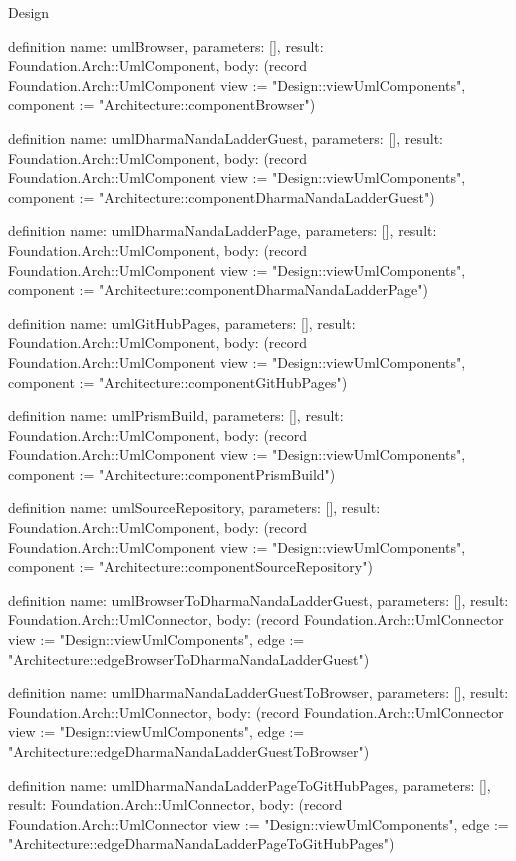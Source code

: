 \begin{lexlean}{Design}
\begin{semanticmodule}
definition{
  name: umlBrowser,
  parameters: [],
  result: Foundation.Arch::UmlComponent,
  body: (record Foundation.Arch::UmlComponent {view := "Design::viewUmlComponents", component := "Architecture::componentBrowser"})
}

definition{
  name: umlDharmaNandaLadderGuest,
  parameters: [],
  result: Foundation.Arch::UmlComponent,
  body: (record Foundation.Arch::UmlComponent {view := "Design::viewUmlComponents", component := "Architecture::componentDharmaNandaLadderGuest"})
}

definition{
  name: umlDharmaNandaLadderPage,
  parameters: [],
  result: Foundation.Arch::UmlComponent,
  body: (record Foundation.Arch::UmlComponent {view := "Design::viewUmlComponents", component := "Architecture::componentDharmaNandaLadderPage"})
}

definition{
  name: umlGitHubPages,
  parameters: [],
  result: Foundation.Arch::UmlComponent,
  body: (record Foundation.Arch::UmlComponent {view := "Design::viewUmlComponents", component := "Architecture::componentGitHubPages"})
}

definition{
  name: umlPrismBuild,
  parameters: [],
  result: Foundation.Arch::UmlComponent,
  body: (record Foundation.Arch::UmlComponent {view := "Design::viewUmlComponents", component := "Architecture::componentPrismBuild"})
}

definition{
  name: umlSourceRepository,
  parameters: [],
  result: Foundation.Arch::UmlComponent,
  body: (record Foundation.Arch::UmlComponent {view := "Design::viewUmlComponents", component := "Architecture::componentSourceRepository"})
}

definition{
  name: umlBrowserToDharmaNandaLadderGuest,
  parameters: [],
  result: Foundation.Arch::UmlConnector,
  body: (record Foundation.Arch::UmlConnector {view := "Design::viewUmlComponents", edge := "Architecture::edgeBrowserToDharmaNandaLadderGuest"})
}

definition{
  name: umlDharmaNandaLadderGuestToBrowser,
  parameters: [],
  result: Foundation.Arch::UmlConnector,
  body: (record Foundation.Arch::UmlConnector {view := "Design::viewUmlComponents", edge := "Architecture::edgeDharmaNandaLadderGuestToBrowser"})
}

definition{
  name: umlDharmaNandaLadderPageToGitHubPages,
  parameters: [],
  result: Foundation.Arch::UmlConnector,
  body: (record Foundation.Arch::UmlConnector {view := "Design::viewUmlComponents", edge := "Architecture::edgeDharmaNandaLadderPageToGitHubPages"})
}


\end{semanticmodule}
\end{lexlean}

